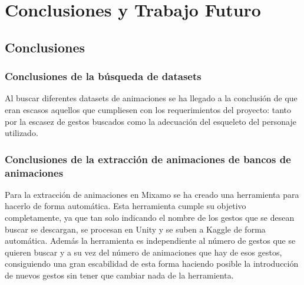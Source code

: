 \chapter{Conclusiones y Trabajo Futuro}
\label{cap:conclusiones}

\section{Conclusiones}




\subsection{Conclusiones de la búsqueda de datasets}
Al buscar diferentes datasets de animaciones se ha llegado a la conclusión de que eran escasos aquellos que cumpliesen con los requerimientos del proyecto: tanto por la escasez de gestos buscados como la adecuación del esqueleto del personaje utilizado.

\subsection{Conclusiones de la extracción de animaciones de bancos de animaciones}
Para la extracción de animaciones en Mixamo se ha creado una herramienta para hacerlo de forma automática.
Esta herramienta cumple su objetivo completamente, ya que tan solo indicando el nombre de los gestos que se desean buscar se descargan, se procesan en Unity y se suben a Kaggle de forma automática.
Además la herramienta es independiente al número de gestos que se quieren buscar y a su vez del número de animaciones que hay de esos gestos, consiguiendo una gran escabilidad de esta forma haciendo posible la introducción de nuevos gestos sin tener que cambiar nada de la herramienta.

